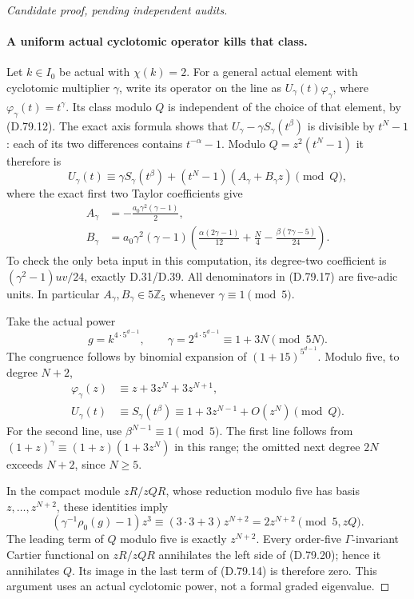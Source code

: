 \begin{proof}[Candidate proof, pending independent audits]
\paragraph{A uniform actual cyclotomic operator kills that class.}
Let \(k\in I_0\) be actual with \(\chi(k)=2\). For a general
actual element with cyclotomic multiplier \(\gamma\), write its
operator on the line as \(U_\gamma(t)\varphi_\gamma\), where
\(\varphi_\gamma(t)=t^\gamma\). Its class modulo \(Q\) is
independent of the choice of that element, by (D.79.12).
The exact axis formula shows that
\(U_\gamma-\gamma S_\gamma(t^\beta)\) is divisible by
\(t^N-1\): each of its two differences contains
\(t^{-\alpha}-1\). Modulo \(Q=z^2(t^N-1)\) it therefore is
\[
 U_\gamma(t)\equiv
 \gamma S_\gamma(t^\beta)+(t^N-1)(A_\gamma+B_\gamma z)
                                                      \pmod Q,\tag{D.79.16}
\]
where the exact first two Taylor coefficients give
\[
 \begin{split}
 A_\gamma&=-\frac{a_0\gamma^2(\gamma-1)}2,\\
 B_\gamma&=a_0\gamma^2(\gamma-1)
       \left(\frac{\alpha(2\gamma-1)}{12}
                    +\frac N4-\frac{\beta(7\gamma-5)}{24}\right).
 \end{split}                                             \tag{D.79.17}
\]
To check the only beta input in this computation, its degree-two
coefficient is \((\gamma^2-1)uv/24\), exactly D.31/D.39.
All denominators in (D.79.17) are five-adic units. In particular
\(A_\gamma,B_\gamma\in5\mathbb Z_5\) whenever
\(\gamma\equiv1\pmod5\).

Take the actual power
\[
 g=k^{4\cdot5^{d-1}},\qquad
 \gamma=2^{4\cdot5^{d-1}}
                  \equiv1+3N\pmod{5N}.               \tag{D.79.18}
\]
The congruence follows by binomial expansion of
\((1+15)^{5^{d-1}}\). Modulo five, to degree \(N+2\),
\[
 \begin{split}
 \varphi_\gamma(z)&\equiv z+3z^N+3z^{N+1},\\
 U_\gamma(t)&\equiv S_\gamma(t^\beta)
                 \equiv1+3z^{N-1}+O(z^N)\pmod Q.
 \end{split}                                             \tag{D.79.19}
\]
For the second line, use \(\beta^{N-1}\equiv1\pmod5\).
The first line follows from
\((1+z)^\gamma\equiv(1+z)(1+3z^N)\) in this range;
the omitted next degree \(2N\) exceeds \(N+2\), since
\(N\ge5\).

In the compact module \(zR/zQR\), whose reduction modulo five
has basis \(z,\ldots,z^{N+2}\), these identities imply
\[
 (\gamma^{-1}\rho_0(g)-1)z^3
       \equiv (3\cdot3+3)z^{N+2}
       =2z^{N+2}\pmod{5,zQ}.                           \tag{D.79.20}
\]
The leading term of \(Q\) modulo five is exactly \(z^{N+2}\).
Every order-five \(\Gamma\)-invariant Cartier functional on
\(zR/zQR\) annihilates the left side of (D.79.20); hence it
annihilates \(Q\). Its image in the last term of (D.79.14)
is therefore zero. This argument uses an actual cyclotomic
power, not a formal graded eigenvalue.


\end{proof}
